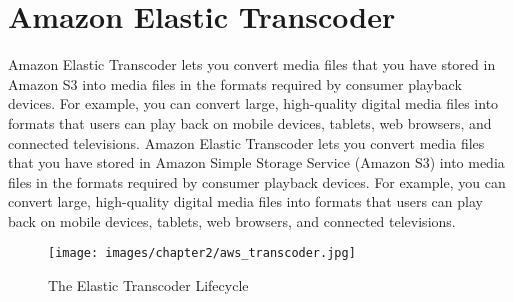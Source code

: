 \section{Amazon Elastic Transcoder}
\label{sec:Amazon Elastic Transcoder}

  Amazon Elastic Transcoder lets you convert media files that you have stored in Amazon S3 into media files in the formats required by consumer playback devices. For example, you can convert large, high-quality digital media files into formats that users can play back on mobile devices, tablets, web browsers, and connected televisions.
Amazon Elastic Transcoder lets you convert media files that you have stored in Amazon Simple Storage Service (Amazon S3) into media files in the formats required by consumer playback devices. For example, you can convert large, high-quality digital media files into formats that users can play back on mobile devices, tablets, web browsers, and connected televisions.

\begin{figure}[htb] %
 \centering
 \texttt{[image: images/chapter2/aws\_transcoder.jpg]}\hfill
 \caption[The Elastic Transcoder Lifecycle]{The Elastic Transcoder Lifecycle}
 \label{fig:fourV}
\end{figure}

